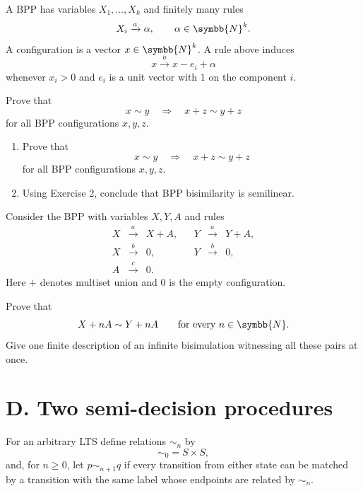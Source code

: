 \documentclass[11pt,a4paper,lmodern]{tutorial}
\DeclareRobustCommand{\N}{\symbb{N}}
\DeclareRobustCommand{\N}{\mathbb{N}}
\newcommand{\trans}[1]{\xrightarrow{#1}}
\begin{document}
A BPP has variables $X_1,\ldots,X_k$ and finitely many rules
\[
     X_i \trans{a} \alpha,
     \qquad \alpha\in\N^k.
\]
A configuration is a vector $x\in\N^k$.  A rule above induces
\[
    x \trans{a} x-e_i+\alpha
\]
whenever $x_i>0$ and $e_i$ is a unit vector with $1$ on the component $i$.

\begin{exercise}
Prove that
\[
      x\sim y
      \quad\Longrightarrow\quad
      x+z\sim y+z
\]
for all BPP configurations $x,y,z$.

\begin{enumerate}[label=(\alph*)]
\item Prove that
\[
x\sim y
\quad\Longrightarrow\quad
x+z\sim y+z
\]
for all BPP configurations $x,y,z$.
\item Using Exercise 2, conclude that BPP bisimilarity is semilinear.
\end{enumerate}
\end{exercise}

\begin{exercise}
Consider the BPP with variables $X,Y,A$ and rules
\[
\begin{array}{rclcrcl}
X &\trans{a}& X+A, &&
Y &\trans{a}& Y+A,\\
X &\trans{b}& 0,   &&
Y &\trans{b}& 0,\\
A &\trans{c}& 0.
\end{array}
\]
Here $+$ denotes multiset union and $0$ is the empty configuration.

Prove that
      \[
          X+nA \sim Y+nA
          \qquad\text{for every }n\in\N.
      \]
Give one finite description of an infinite bisimulation witnessing all
      these pairs at once.

\end{exercise}


\section*{D. Two semi-decision procedures}

For an arbitrary LTS define relations $\sim_n$ by
\[
  \sim_0=S\times S,
\]
and, for $n\geq 0$, let $p\sim_{n+1}q$ if every transition from either
state can be matched by a transition with the same label whose endpoints
are related by $\sim_n$.
\end{document}
